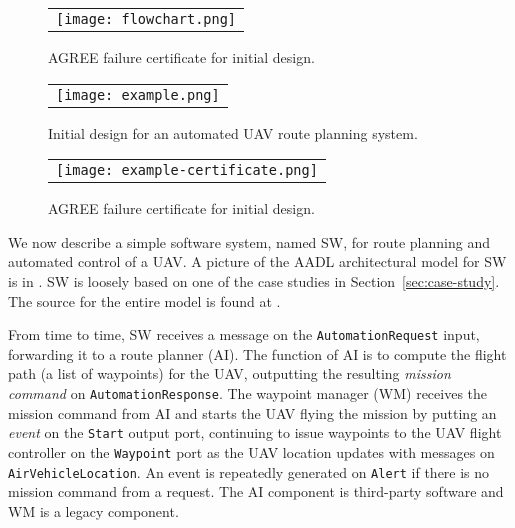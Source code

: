 \begin{figure*}
  \begin{center}
    \begin{tabular}{c}
      \texttt{[image: flowchart.png]} \\
    \end{tabular}
  \end{center}
\caption{AGREE failure certificate for initial design.}
\label{fig:example-certificate}
\end{figure*}

\begin{figure*}[h]
  \begin{center}
    \begin{tabular}{c}
      \texttt{[image: example.png]}
    \end{tabular}
  \end{center}
\caption{Initial design for an automated UAV route planning system.}
\label{fig:example}
\end{figure*}

\begin{figure}
  \begin{center}
    \begin{tabular}{c}
      \texttt{[image: example-certificate.png]} \\
    \end{tabular}
  \end{center}
\caption{AGREE failure certificate for initial design.}
\label{fig:example-certificate}
\end{figure}


We now describe a simple software system, named SW, for route planning
and automated control of a UAV. A picture of the AADL architectural
model for SW is in . SW is loosely based on one of
the case studies in Section~\ref{sec:case-study}.  The source for the
entire model is found at \cite{repo}.

From time to time, SW receives a message on the \texttt{AutomationRequest} input,
forwarding it to a route planner (AI). The function of AI is to 
compute the flight path (a list of waypoints) for the UAV, outputting
the resulting \emph{mission command} on \texttt{AutomationResponse}.
The waypoint manager (WM) receives the mission command from AI and
starts the UAV flying the mission by putting an \emph{event} on the
\texttt{Start} output port, continuing to issue waypoints to the UAV
flight controller on the \texttt{Waypoint} port as the UAV location
updates with messages on \texttt{AirVehicleLocation}.
An event is repeatedly generated on \texttt{Alert} if there is no
mission command from a request. The AI component is third-party
software and WM is a legacy component.

